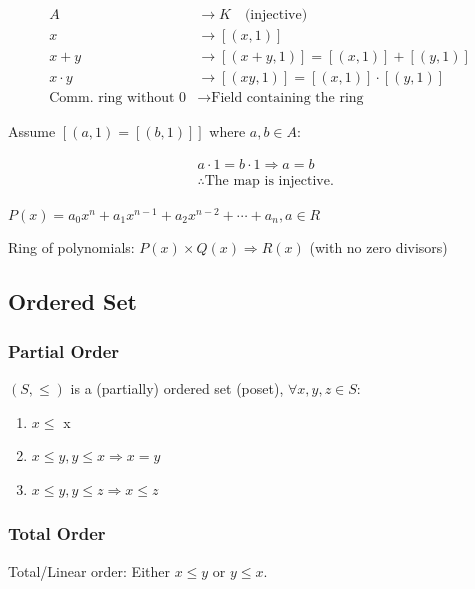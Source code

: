 \documentclass{article}
\begin{document}
    \begin{align*}
        A &\longrightarrow K \quad \text{{(injective)}} \\
        x &\longrightarrow [(x, 1)] \\
        x + y &\longrightarrow [(x + y, 1)] = [(x, 1)] + [(y, 1)] \\
        x \cdot y &\longrightarrow [(xy, 1)] = [(x, 1)] \cdot [(y, 1)] \\
        \text{Comm. ring without } 0 &\longrightarrow \text{Field containing the ring}
    \end{align*}

    Assume $[(a, 1) = [(b, 1)]]$ where $a, b \in A$:
    
    \begin{align*}
        &a \cdot 1 = b \cdot 1 \Rightarrow a = b \\
        &\therefore \text{The map is injective.}
    \end{align*}
    
    $P(x) = a_{0}x^{n} + a_{1}x^{n - 1} + a_{2}x^{n - 2} + \cdots + a_{n}, a \in R$
    
    Ring of polynomials: $P(x) \times Q(x) \Rightarrow R(x)$ (with no zero divisors)
    
    \subsection{Ordered Set}
    
    \subsubsection{Partial Order}
    
    $(S, \leq)$ is a (partially) ordered set (poset), $\forall x, y, z \in S$:
    
    \begin{enumerate}
        \item $x \leq$ x
        \item $x \leq y, y \leq x \Rightarrow x = y$
        \item $x \leq y, y \leq z \Rightarrow x \leq z$
    \end{enumerate}

    \subsubsection{Total Order}

    Total/Linear order: Either $x \leq y$ or $y \leq x$.
    
\end{document}
